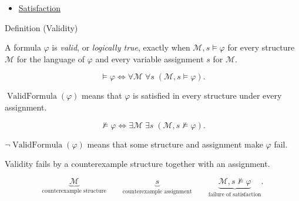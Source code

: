 \begin{dependencies}
\begin{itemize}
  \item \hyperref[def:fol-satisfaction]{Satisfaction}
\end{itemize}
\end{dependencies}

\begin{definitionbox}{Definition (Validity)}
\begin{definition}[Validity]
\label{def:validity}
A formula \(\varphi\) is \emph{valid}, or \emph{logically true}, exactly when
\(\mathcal M,s\models\varphi\) for every structure \(\mathcal M\) for the
language of \(\varphi\) and every variable assignment \(s\) for \(\mathcal M\).
\end{definition}
\end{definitionbox}

\begin{remark*}
\[
\models\varphi
\Longleftrightarrow
\forall \mathcal M\;\forall s\;(\mathcal M,s\models\varphi).
\]
\end{remark*}

\begin{remark*}
\(\operatorname{ValidFormula}(\varphi)\) means that \(\varphi\) is satisfied in
every structure under every assignment.
\end{remark*}

\begin{remark*}
\[
\not\models\varphi
\Longleftrightarrow
\exists \mathcal M\;\exists s\;(\mathcal M,s\not\models\varphi).
\]
\end{remark*}

\begin{remark*}
\(\neg\operatorname{ValidFormula}(\varphi)\) means that some structure and
assignment make \(\varphi\) fail.
\end{remark*}

\begin{remark*}
Validity fails by a counterexample structure together with an assignment.
\end{remark*}

\begin{remark*}
\[
\underbrace{\mathcal M}_{\text{counterexample structure}}
\qquad
\underbrace{s}_{\text{counterexample assignment}}
\qquad
\underbrace{\mathcal M,s\not\models\varphi}_{\text{failure of satisfaction}}.
\]
\end{remark*}

